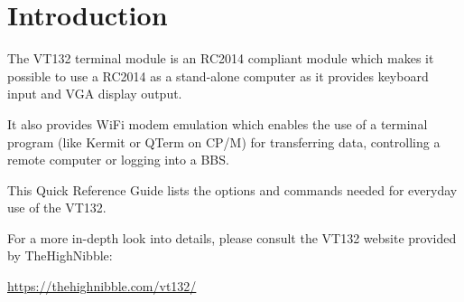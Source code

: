 \chapter{Introduction}

The VT132 terminal module is an RC2014 compliant module which makes it possible to use a RC2014 as a stand-alone computer
as it provides keyboard input and VGA display output.

It also provides WiFi modem emulation which enables the use of a terminal program (like Kermit or QTerm on CP/M) for
transferring data, controlling a remote computer or logging into a BBS.

This Quick Reference Guide lists the options and commands needed for everyday use of the VT132.

For a more in-depth look into details, please consult the VT132 website provided by TheHighNibble:

\url{https://thehighnibble.com/vt132/}

